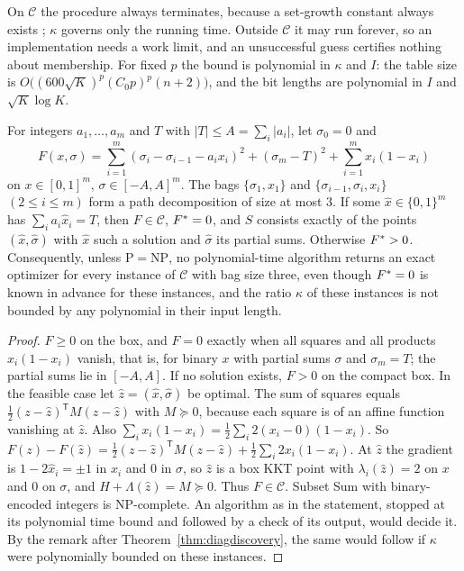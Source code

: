 On $\mathcal C$ the procedure always terminates, because a set-growth
constant always exists \cite[Theorem~3.3]{LuoSturm2000}; $\kappa$ governs only
the running time. Outside $\mathcal C$ it may run forever, so an
implementation needs a work limit, and an unsuccessful guess certifies
nothing about membership. For fixed $p$ the bound is polynomial in $\kappa$
and $I$: the table size is $O\bigl((600\sqrt K)^p(C_0p)^p(n+2)\bigr)$, and the
bit lengths are polynomial in $I$ and $\sqrt K\log K$.

\begin{proposition}\label{prop:sshard}
For integers $a_1,\ldots,a_m$ and $T$ with $|T|\le A=\sum_i|a_i|$, let
$\sigma_0=0$ and
\[
F(x,\sigma)=\sum_{i=1}^m(\sigma_i-\sigma_{i-1}-a_ix_i)^2+(\sigma_m-T)^2
+\sum_{i=1}^mx_i(1-x_i)
\]
on $x\in[0,1]^m$, $\sigma\in[-A,A]^m$. The bags $\{\sigma_1,x_1\}$ and
$\{\sigma_{i-1},\sigma_i,x_i\}$ $(2\le i\le m)$ form a path decomposition of
size at most $3$. If some $\hat x\in\{0,1\}^m$ has $\sum_ia_i\hat x_i=T$, then
$F\in\mathcal C$, $F^*=0$, and $S$ consists exactly of the points
$(\hat x,\hat\sigma)$ with $\hat x$ such a solution and $\hat\sigma$ its
partial sums. Otherwise $F^*>0$. Consequently, unless $\mathrm P=\mathrm{NP}$,
no polynomial-time algorithm returns an exact optimizer for every instance of
$\mathcal C$ with bag size three, even though $F^*=0$ is known in advance for
these instances, and the ratio $\kappa$ of these instances is not bounded by
any polynomial in their input length.
\end{proposition}

\begin{proof}
$F\ge0$ on the box, and $F=0$ exactly when all squares and all products
$x_i(1-x_i)$ vanish, that is, for binary $x$ with partial sums $\sigma$ and
$\sigma_m=T$; the partial sums lie in $[-A,A]$. If no solution exists, $F>0$
on the compact box. In the feasible case let $\hat z=(\hat x,\hat\sigma)$ be
optimal. The sum of
squares equals $\frac12(z-\hat z)^{\mathsf T}M(z-\hat z)$ with $M\succeq0$,
because each square is of an affine function vanishing at $\hat z$. Also
$\sum_ix_i(1-x_i)=\frac12\sum_i2(x_i-0)(1-x_i)$. So
$F(z)-F(\hat z)=\frac12(z-\hat z)^{\mathsf T}M(z-\hat z)+\frac12\sum_i2x_i(1-x_i)$.
At $\hat z$ the gradient is $1-2\hat x_i=\pm1$ in $x_i$ and $0$ in
$\sigma$, so $\hat z$ is a box KKT point with $\lambda_i(\hat z)=2$ on $x$ and
$0$ on $\sigma$, and $H+\Lambda(\hat z)=M\succeq0$. Thus $F\in\mathcal C$.
Subset Sum with binary-encoded integers is NP-complete. An algorithm as in the
statement, stopped at its polynomial time bound and followed by a check of its
output, would decide it. By the remark after Theorem~\ref{thm:diagdiscovery},
the same would follow if $\kappa$ were polynomially bounded on these instances.
\end{proof}

